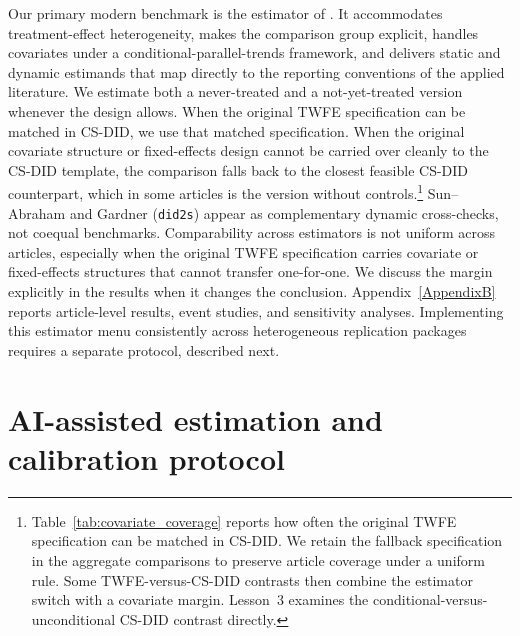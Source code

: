 Our primary modern benchmark is the estimator of \textcite{callaway2021difference}. It accommodates treatment-effect heterogeneity, makes the comparison group explicit, handles covariates under a conditional-parallel-trends framework, and delivers static and dynamic estimands that map directly to the reporting conventions of the applied literature. We estimate both a never-treated and a not-yet-treated version whenever the design allows. When the original TWFE specification can be matched in CS-DID, we use that matched specification. When the original covariate structure or fixed-effects design cannot be carried over cleanly to the CS-DID template, the comparison falls back to the closest feasible CS-DID counterpart, which in some articles is the version without controls.\footnote{Table~\ref{tab:covariate_coverage} reports how often the original TWFE specification can be matched in CS-DID. We retain the fallback specification in the aggregate comparisons to preserve article coverage under a uniform rule. Some TWFE-versus-CS-DID contrasts then combine the estimator switch with a covariate margin. Lesson~3 examines the conditional-versus-unconditional CS-DID contrast directly.} Sun--Abraham and Gardner (\texttt{did2s}) appear as complementary dynamic cross-checks, not coequal benchmarks. Comparability across estimators is not uniform across articles, especially when the original TWFE specification carries covariate or fixed-effects structures that cannot transfer one-for-one. We discuss the margin explicitly in the results when it changes the conclusion. Appendix~\ref{AppendixB} reports article-level results, event studies, and sensitivity analyses. Implementing this estimator menu consistently across heterogeneous replication packages requires a separate protocol, described next.







%



\section{AI-assisted estimation and calibration protocol}

